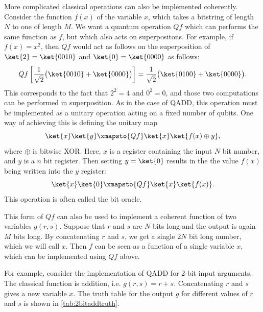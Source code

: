 More complicated classical operations can also be implemented coherently. Consider the function $f(x)$ of the variable $x$, which takes a bitstring of length $N$ to one of length $M$.  We want a quantum operation $Qf$ which can performs the same function as $f$, but which also acts on superpositons. For example, if $f(x)=x^2$, then $Qf$ would act as follows on the superposition of $\ket{2} = \ket{0010}$ and $\ket{0}=\ket{0000}$ as follows: $$Qf\left[\frac{1}{\sqrt{2}}\big(\ket{0010}+\ket{0000}\big)\right]=\frac{1}{\sqrt{2}}\big(\ket{0100}+\ket{0000}\big).$$ This corresponds to the fact that $2^2 = 4$ and $0^2 = 0$, and those two computations can be performed in superposition. As in the case of QADD, this operation must be implemented as a unitary operation acting on a fixed number of qubits. One way of achieving this is defining the unitary map $$\ket{x}\ket{y} \xmapsto{Qf}  \ket{x}\ket{f(x) \oplus y},$$ where $\oplus$ is bitwise XOR. Here, $x$ is a register containing the input $N$ bit number, and $y$ is a $n$ bit register. Then setting $y=\ket{0}$ results in the the value $f(x)$ being written into the $y$ register: $$\ket{x}\ket{0} \xmapsto{Qf}  \ket{x}\ket{f(x)}.$$ This operation is often called the bit oracle. 

This form of $Qf$ can also be used to implement a coherent function of two variables $g(r,s)$. Suppose that $r$ and $s$ are $N$ bits long and the output is again $M$ bits long. By concatenating $r$ and $s$, we get a single $2N$ bit long number, which we will call $x$. Then $f$ can be seen as a function of a single variable $x$, which can be implemented using $Qf$ above. 

For example, consider the implementation of QADD for 2-bit input arguments. The classical function is addition, i.e. $g(r,s) = r+s$. Concatenating $r$ and $s$ gives a new variable $x$. The truth table for the output $g$ for different values of $r$ and $s$ is shown in \autoref{tab:2bitaddtruth}.

